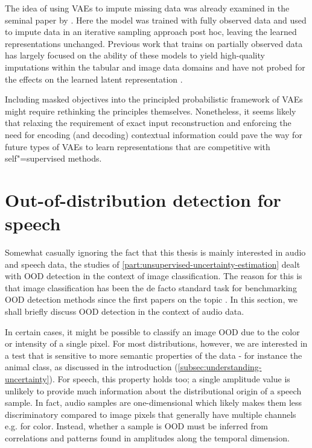 The idea of using VAEs to impute missing data was already examined in the seminal paper by \textcite{rezende_stochastic_2014}. Here the model was trained with fully observed data and used to impute data in an iterative sampling approach post hoc, leaving the learned representations unchanged.
Previous work that trains on partially observed data has largely focused on the ability of these models to yield high-quality imputations within the tabular and image data domains and have not probed for the effects on the learned latent representation \parencite{mattei_miwae_2019, ipsen_not-miwae_2021}. 

Including masked objectives into the principled probabilistic framework of VAEs might require rethinking the principles themselves. Nonetheless, it seems likely that relaxing the requirement of exact input reconstruction and enforcing the need for encoding (and decoding) contextual information could pave the way for future types of VAEs to learn representations that are competitive with self"=supervised methods.


\section{Out-of-distribution detection for speech}
%
%
Somewhat casually ignoring the fact that this thesis is mainly interested in audio and speech data, the studies of \cref{part:unsupervised-uncertainty-estimation} dealt with OOD detection in the context of image classification. The reason for this is that image classification has been the de facto standard task for benchmarking OOD detection methods since the first papers on the topic \parencite{choi_waic_2019,nalisnick_detecting_2019,hendrycks_deep_2019,kirichenko_why_2020}. In this section, we shall briefly discuss OOD detection in the context of audio data. 

In certain cases, it might be possible to classify an image OOD due to the color or intensity of a single pixel. 
For most distributions, however, we are interested in a test that is sensitive to more semantic properties of the data - for instance the animal class, as discussed in the introduction (\cref{subsec:understanding-uncertainty}). 
For speech, this property holds too; a single amplitude value is unlikely to provide much information about the distributional origin of a speech sample. In fact, audio samples are one-dimensional which likely makes them less discriminatory compared to image pixels that generally have multiple channels e.g. for color. Instead, whether a sample is OOD must be inferred from correlations and patterns found in amplitudes along the temporal dimension. 

